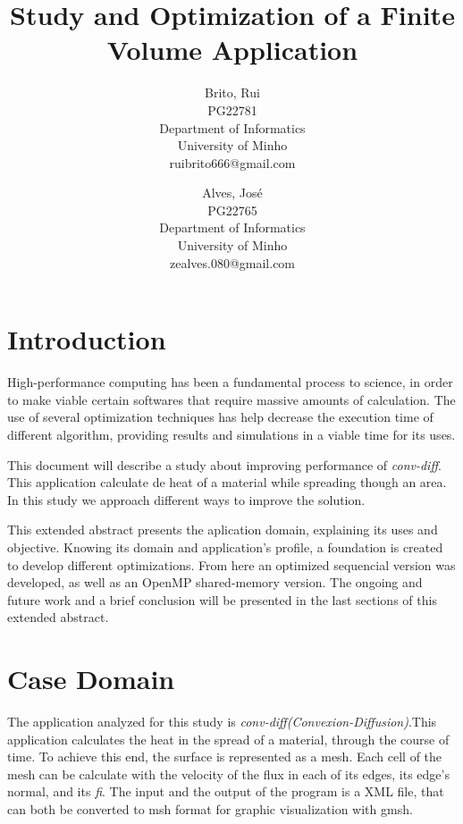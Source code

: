\documentclass[a4paper,10pt,openright,openbib,twocolumn]{article}
\begin{document}
\begin{multicols}{2}
\title{Study and Optimization of a Finite Volume Application}
\author{
    Brito, Rui\\
    PG22781\\
    Department of Informatics\\
    University of Minho\\
    ruibrito666@gmail.com
  \and
    Alves, José\\
    PG22765\\
    Department of Informatics\\
    University of Minho\\
    zealves.080@gmail.com
}
\date{}
\maketitle
\end{multicols}

\section{Introduction}

High-performance computing has been a fundamental process to science, in order to make viable certain softwares that require massive amounts of calculation. The use of several optimization techniques has help decrease the execution time of different algorithm, providing results and simulations in a viable time for its uses.

This document will describe a study about improving performance of \emph{conv-diff}. This application calculate de heat of a material while spreading though an area. In this study we approach different ways to improve the solution.

This extended abstract presents the aplication domain, explaining its uses and objective. Knowing its domain and application's profile, a foundation is created to develop different optimizations. From here an optimized sequencial version was developed, as well as an OpenMP shared-memory version. The ongoing and future work and a brief conclusion will be presented in the last sections of this extended abstract.

\section{Case Domain}

The application analyzed for this study is \emph{conv-diff(Convexion-Diffusion)}.This application calculates the heat in the spread of a material, through the course of time. To achieve this end, the surface is represented as a mesh. Each cell of the mesh can be calculate with the velocity of the flux in each of its edges, its edge's normal, and its \emph{fi}.
The input and the output of the program is a XML file, that can both be converted to msh format for graphic visualization with gmsh.
\end{document}
